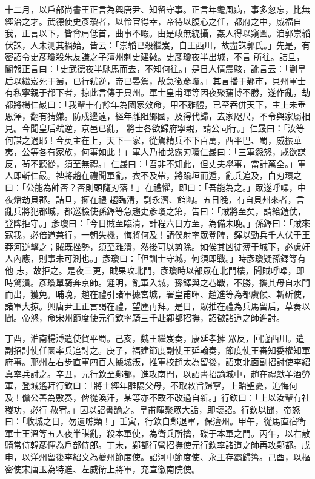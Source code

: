 \begin{pinyinscope}
 十二月，以戶部尚書王正言為興唐尹、知留守事。正言年耄風病，事多忽忘，比無經治之才。武德使史彥瓊者，以伶官得幸，帝待以腹心之任，都府之中，威福自我，正言以下，皆脅肩低首，曲事不暇。由是政無統攝，姦人得以窺圖。洎郭崇韜伏誅，人未測其禍始，皆云：「崇韜已殺繼岌，自王西川，故盡誅郭氏。」先是，有密詔令史彥瓊殺朱友謙之子澶州刺史建徽。史彥瓊夜半出城，不言
 所往。詰旦，閽報正言曰：「史武德夜半馳馬而去，不知何往。」是日人情震駭，訛言云：「劉皇后以繼岌死于蜀，已行弒逆，帝已晏駕，故急徵彥瓊。」其言播于鄴市，貝州軍士有私寧親于都下者，掠此言傳于貝州。軍士皇甫暉等因夜聚蒱博不勝，遂作亂，劫都將楊仁晸曰：「我輩十有餘年為國家效命，甲不離體，已至吞併天下，主上未垂恩澤，翻有猜嫌。防戍邊遠，經年離阻鄉國，及得代歸，去家咫尺，不令與家屬相見。今聞皇后弒逆，京邑已亂，
 將士各欲歸府寧親，請公同行。」仁晸曰：「汝等何謀之過耶！今英主在上，天下一家，從駕精兵不下百萬，西平巴、蜀，威振華夷，公等各有家族，何事如此！」軍人乃抽戈露刃環仁晸曰：「三軍怨怒，咸欲謀反，茍不聽從，須至無禮。」仁晸曰：「吾非不知此，但丈夫舉事，當計萬全。」軍人即斬仁晸。裨將趙在禮聞軍亂，衣不及帶，將踰垣而遁，亂兵追及，白刃環之曰：「公能為帥否？否則頭隨刃落！」在禮懼，即曰：「吾能為之。」眾遂呼噪，中夜燔劫貝郡。詰旦，擁在禮
 趨臨清，剽永濟、館陶。五日晚，有自貝州來者，言亂兵將犯都城，都巡檢使孫鐸等急趨史彥瓊之第，告曰：「賊將至矣，請給鎧仗，登陴拒守。」彥瓊曰：「今日賊至臨清，計程六日方至，為備未晚。」孫鐸曰：「賊來寇我，必倍道兼行，一朝失機，悔將何及！請僕射率眾登陴，鐸以勁兵千人伏于王莽河逆擊之；賊既挫勢，須至離潰，然後可以剪除。如俟其凶徒薄于城下，必慮奸人內應，則事未可測也。」彥瓊曰：「但訓士守城，何須即戰。」時彥瓊疑孫鐸等有他
 志，故拒之。是夜三更，賊果攻北門，彥瓊時以部眾在北門樓，聞賊呼噪，即時驚潰。彥瓊單騎奔京師。遲明，亂軍入城，孫鐸與之巷戰，不勝，攜其母自水門而出，獲免。晡晚，趙在禮引諸軍據宮城，署皇甫暉、趙進等為都虞候、斬斫使，諸軍大掠。興唐尹王正言謁在禮，望塵再拜。是日，眾推在禮為兵馬留后，草奏以聞。帝怒，命宋州節度使元行欽率騎三千赴鄴都招撫，詔徵諸道之師進討。



 丁酉，淮南楊溥遣使賀平蜀。己亥，魏王繼岌奏，康延孝擁
 眾反，回寇西川。遣副招討使任圜率兵追討之。庚子，福建節度副使王延翰奏，節度使王審知委權知軍府事。邢州左右步直軍四百人據城叛，推軍校趙太為留後，詔東北面副招討使李紹真率兵討之。辛丑，元行欽至鄴都，進攻南門，以詔書招諭城中，趙在禮獻羊酒勞軍，登城遙拜行欽曰：「將士經年離隔父母，不取敕旨歸寧，上貽聖憂，追悔何及！儻公善為敷奏，俾從渙汗，某等亦不敢不改過自新。」行欽曰：「上以汝輩有社稷功，必行
 赦宥。」因以詔書諭之。皇甫暉聚眾大詬，即壞詔。行欽以聞，帝怒曰：「收城之日，勿遺噍類！」壬寅，行欽自鄴退軍，保澶州。甲午，從馬直宿衛軍士王溫等五人夜半謀亂，殺本軍使，為衛兵所擒，磔于本軍之門。丙午，以右散騎常侍韓彥惲為戶部侍郎。丁未，鄴都行營招撫使元行欽率諸道之師再攻鄴都。戊申，以洋州留後李紹文為夔州節度使。詔河中節度使、永王存霸歸籓。己酉，以樞密使宋唐玉為特進、左威衛上將軍，充宣徽南院使。




\end{pinyinscope}
